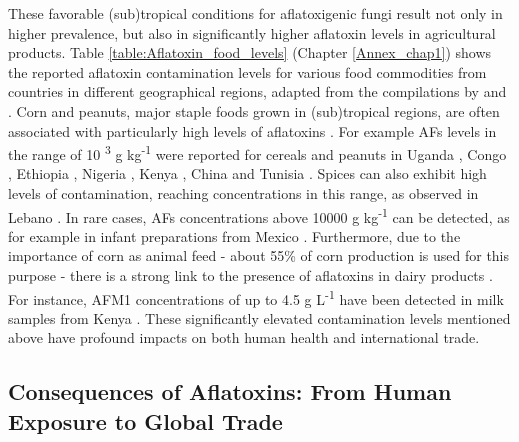 These favorable (sub)tropical conditions for aflatoxigenic fungi result not only in higher prevalence, but also in significantly higher aflatoxin levels in agricultural products. Table \ref{table:Aflatoxin_food_levels} (Chapter \ref{Annex_chap1}) shows the reported aflatoxin contamination levels for various food commodities from countries in different geographical regions, adapted from the compilations by \citet{jallow2021worldwide} and \citet{ismail2018aflatoxin}. Corn and peanuts, major staple foods grown in (sub)tropical regions, are often associated with particularly high levels of aflatoxins \citep{ismail2018aflatoxin}. For example \textSigma AFs levels in the range of 10 \textsuperscript{3} \textmu g kg\textsuperscript{-1} were reported for cereals and peanuts in Uganda \citep{sserumaga2020aflatoxin}, Congo \citep{kamika2016occurrence}, Ethiopia \citep{mohammed2016aspergillus}, Nigeria \citep{oyedele2017mycotoxin}, Kenya \citep{sirma2016aflatoxin}, China \citep{wu2016aflatoxin} and Tunisia \citep{houissa2019multimycotoxin}.
Spices can also exhibit high levels of contamination, reaching concentrations in this range, as observed in Lebano \citep{el2019multimycotoxins}. In rare cases, \textSigma AFs concentrations above 10000 \textmu g kg\textsuperscript{-1} can be detected, as for example in infant preparations from Mexico \citep{chala2013natural}. Furthermore, due to the importance of corn as animal feed - about 55\% of corn production is used for this purpose - there is a strong link to the presence of aflatoxins in dairy products \citep{tolosa2021multi}. For instance, AFM1 concentrations of up to 4.5 \textmu g L\textsuperscript{-1} have been detected in milk samples from Kenya \citep{kuboka2019occurrence}. These significantly elevated contamination levels mentioned above have profound impacts on both human health and international trade.

\subsection{Consequences of Aflatoxins: From Human Exposure to Global Trade} \label{subchap:AFs_consequences}

